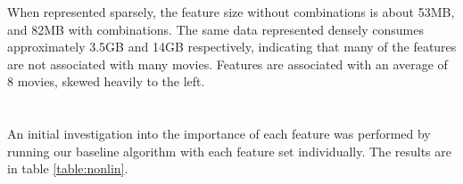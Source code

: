\documentclass[journal]{IEEEtran}
\begin{document}

When represented sparsely, the feature size without combinations is about 53MB, and 82MB with combinations.  The same data represented
densely consumes approximately 3.5GB and 14GB respectively, indicating that many of the features are not associated with many movies.  Features are associated with an average of 8 movies, skewed heavily to the left. \\
\\
\\
An initial investigation into the importance of each feature was performed by
running our baseline algorithm with each feature set individually. The results
are in table \ref{table:nonlin}.
\end{document}
